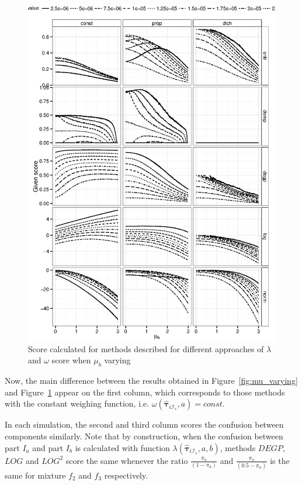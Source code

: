 \documentclass[10pt, a4paper]{article}
\newcommand{\m}[1]{\boldsymbol{#1}}
\begin{document}
\begin{figure}[!t]
\centering
\includegraphics[scale=.5]{fig01ball.eps}
\caption{Score calculated for methods described for different approaches of $\lambda$ and $\omega$ score when $\mu_b$ varying}
\label{fig:mu_varying3}
\end{figure}


Now, the main difference between the results obtained in Figure~\ref{fig:mu_varying} and Figure~\ref{fig:mu_varying3} appear on the first column, which corresponds to those methods with the constant weighing function, i.e. $\omega(\hat{\m \tau}_{i \mathcal{I}_s}, a) = const$.

In each simulation, the second and third column scores the confusion between components similarly. Note that by construction, when the confusion between part $I_a$ and part $I_b$ is calculated with function $\lambda(\hat{\m \tau}_{i \mathcal{I}_s}, a, b)$, methods $DEGP$, $LOG$ and $LOG^2$ score the same whenever the ratio $\frac{\pi_a}{(1 - \pi_a)}$ and $\frac{\pi_a}{(0.5 - \pi_a)}$ is the same for mixture $f_2$ and $f_3$ respectively.
\end{document}

